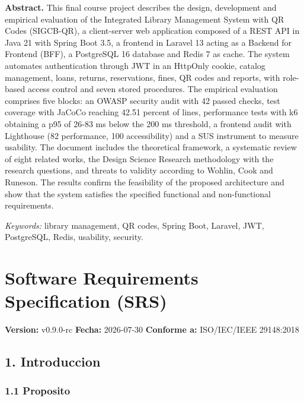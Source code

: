\documentclass[
11pt,
a4paper,
]{report}
\begin{document}
	\textbf{Abstract.} This final course project describes the design, development and empirical evaluation of the Integrated Library Management System with QR Codes (SIGCB-QR), a client-server web application composed of a REST API in Java 21 with Spring Boot 3.5, a frontend in Laravel 13 acting as a Backend for Frontend (BFF), a PostgreSQL 16 database and Redis 7 as cache. The system automates authentication through JWT in an HttpOnly cookie, catalog management, loans, returns, reservations, fines, QR codes and reports, with role-based access control and seven stored procedures. The empirical evaluation comprises five blocks: an OWASP security audit with 42 passed checks, test coverage with JaCoCo reaching 42.51 percent of lines, performance tests with k6 obtaining a p95 of 26-83 ms below the 200 ms threshold, a frontend audit with Lighthouse (82 performance, 100 accessibility) and a SUS instrument to measure usability. The document includes the theoretical framework, a systematic review of eight related works, the Design Science Research methodology with the research questions, and threats to validity according to Wohlin, Cook and Runeson. The results confirm the feasibility of the proposed architecture and show that the system satisfies the specified functional and non-functional requirements.
	
	\emph{Keywords:} library management, QR codes, Spring Boot, Laravel, JWT, PostgreSQL, Redis, usability, security.
	
	\newpage
	
	{
		\hypersetup{linkcolor=}
		\setcounter{tocdepth}{3}
		\tableofcontents
	}
	\hypertarget{software-requirements-specification-srs}{%
		\chapter{Software Requirements Specification (SRS)}\label{software-requirements-specification-srs}}
	
	\textbf{Version:} v0.9.0-rc
	\textbf{Fecha:} 2026-07-30
	\textbf{Conforme a:} ISO/IEC/IEEE 29148:2018
	
	\hypertarget{introduccion}{%
		\section{1. Introduccion}\label{introduccion}}
	
	\hypertarget{proposito}{%
		\subsection{1.1 Proposito}\label{proposito}}
	
\end{document}
